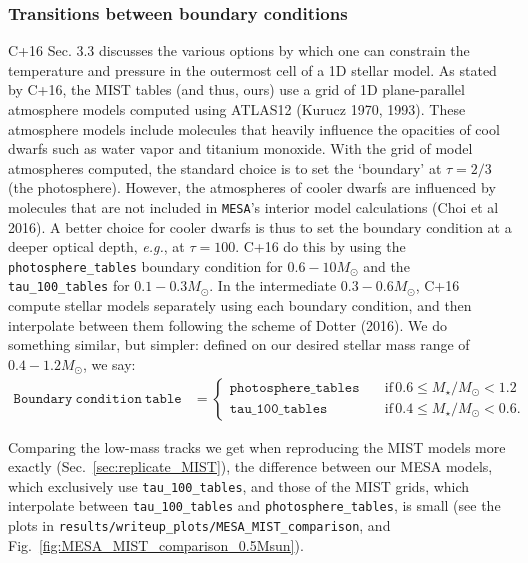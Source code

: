 \documentclass{article}
\begin{document}
\subsubsection{Transitions between boundary conditions}
\label{sec:transitions}
C+16 Sec. 3.3 discusses the various options by which one can constrain the 
temperature and pressure in the outermost cell of a 1D stellar model.
As stated by C+16, the MIST tables (and thus, ours) use a grid 
of 1D plane-parallel atmosphere models computed using ATLAS12 (Kurucz 1970, 
1993). These atmosphere models include molecules that heavily influence the 
opacities of cool dwarfs such as water vapor and titanium monoxide.
With the grid of model atmospheres computed, the standard choice is to set the 
`boundary' at $\tau=2/3$ (the photosphere).
However, the atmospheres of cooler dwarfs are influenced by molecules that are 
not included in \texttt{MESA}'s interior model calculations (Choi et al 2016).
A better choice for cooler dwarfs is thus to set the boundary condition 
at a deeper optical depth, \textit{e.g.}, at $\tau=100$.
C+16 do this by using the \texttt{photosphere\_tables} boundary condition 
for $0.6-10M_\odot$ and the \texttt{tau\_100\_tables} for $0.1-0.3M_\odot$. In 
the intermediate $0.3-0.6M_\odot$, C+16 compute stellar models separately 
using each boundary condition, and then interpolate between them following the 
scheme of Dotter (2016).
We do something similar, but simpler: defined on our desired stellar mass range 
of $0.4-1.2M_\odot$, we say: 
\begin{align}
\mathtt{Boundary\ condition\ table} &=
\begin{cases}
\mathtt{photosphere\_tables} \quad 
&\mathrm{if}\,0.6\leq M_\star/M_\odot<1.2\\
\mathtt{tau\_100\_tables} \quad 
&\mathrm{if}\,0.4\leq M_\star/M_\odot<0.6.
\end{cases}
\end{align}

Comparing the low-mass tracks we get when reproducing the MIST models more
exactly (Sec.~\ref{sec:replicate_MIST}), the difference between our MESA
models, which exclusively use \texttt{tau\_100\_tables}, and those of the MIST
grids, which interpolate between \texttt{tau\_100\_tables} and
\texttt{photosphere\_tables}, is small (see the plots in
\texttt{results/writeup\_plots/MESA\_MIST\_comparison}, and 
Fig.~\ref{fig:MESA_MIST_comparison_0.5Msun}).
\end{document}
